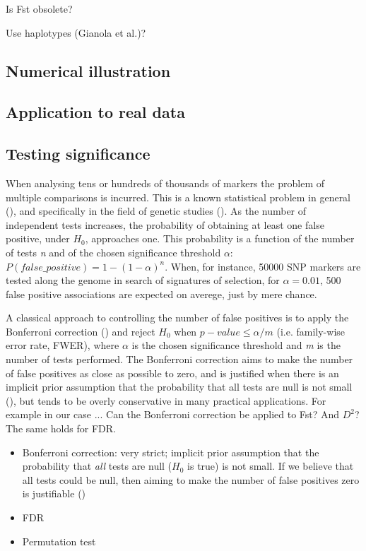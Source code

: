 \documentclass{bmcart}
\begin{document}
Is Fst obsolete?

Use haplotypes (Gianola et al.)?

\subsection*{Numerical illustration}

\subsection*{Application to real data}

\subsection*{Testing significance}

When analysing tens or hundreds of thousands of markers the problem of
multiple comparisons is incurred. This is a known statistical problem in general
(\cite{berry2007difficult}), and specifically in the field of genetic
studies (\cite{lander1994genetic,risch1996future}). As the number of
independent tests increases, the probability of obtaining at least one
false positive, under $H_0$, approaches one. This probability is a
function of the number of tests \emph{n} and of the chosen significance
threshold \emph{\(\alpha\)}: \(P(false\_positive)=1-(1-\alpha)^n\). When, for instance,
50000 SNP markers are tested along the genome in search of signatures of
selection, for $\alpha=0.01$, 500 false positive associations are expected on averege, just
by mere chance. 

A classical approach to controlling the number of false positives is to
apply the Bonferroni correction (\cite{hochberg1988sharper}) and
reject $H_0$ when $p-value \leq  \alpha/m$ (i.e. family-wise error rate,
FWER), where $\alpha$ is the chosen
significance threshold and \emph{m} is the number of tests performed. 
The Bonferroni correction aims to make the number of false positives as
close as possible to zero, and is justified when there is an implicit prior
assumption that the probability that all tests are null is not small
(\cite{westfall1997bayesian,wakefield2008reporting}), but tends to be overly conservative in
many practical applications. For example in our case ...
Can the Bonferroni correction be applied to Fst? And $D^2$? The same holds
for FDR.


\begin{itemize}
\item Bonferroni correction: very strict; implicit prior assumption that the
probability that \emph{all} tests are null ($H_0$ is true) is not small. If we believe
that all tests could be null, then aiming to make the number of false
positives zero is justifiable (\cite{wakefield2008reporting})
\item FDR
\item Permutation test
\end{itemize}
\end{document}

